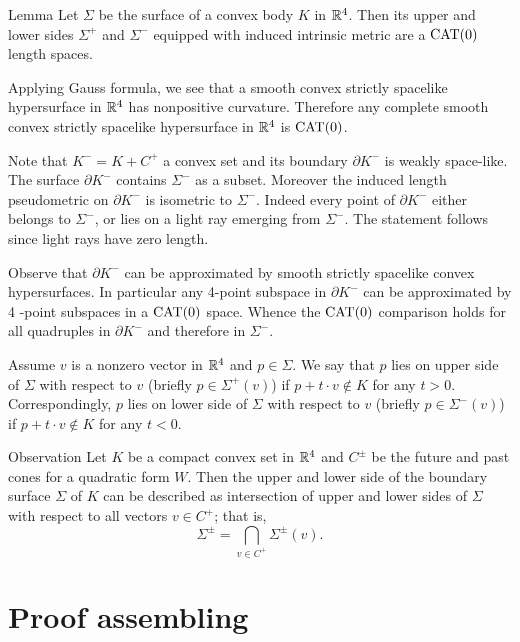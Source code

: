 \documentclass{article}
\begin{document}
\begin{thm}{Lemma}\label{lem:sides}
Let $\Sigma$ be the surface of a convex body $K$ in $\mathbb{R}^4$.
Then its upper and lower sides $\Sigma^+$ and $\Sigma^-$ equipped with induced intrinsic metric are a $\mathrm{CAT}(0)$ length spaces. 
\end{thm}

Applying Gauss formula, we see that a smooth convex strictly spacelike hypersurface in $\mathbb{R}^4$ has nonpositive curvature.
Therefore any complete smooth convex strictly spacelike hypersurface in $\mathbb{R}^4$ is $\mathrm{CAT}(0)$.

Note that $K^-=K+C^+$ a convex set and its boundary $\partial K^-$ is weakly space-like.
The surface $\partial K^-$ contains $\Sigma^-$ as a subset.
Moreover the induced length pseudometric on $\partial K^-$ is isometric to $\Sigma^-$.
Indeed every point of $\partial K^-$ either belongs to  $\Sigma^-$, or lies on a light ray emerging from $\Sigma^-$.
The statement follows since light rays have zero length.

Observe that $\partial K^-$ can be approximated by smooth strictly spacelike convex hypersurfaces.
In particular any 4-point subspace in $\partial K^-$ can be approximated by 4 -point subspaces in a $\mathrm{CAT}(0)$ space.
Whence the $\mathrm{CAT}(0)$ comparison holds for all quadruples in $\partial K^-$ and therefore in $\Sigma^-$.
\qeds




Assume $v$ is a nonzero vector in $\mathbb{R}^4$ and $p\in\Sigma$.
We say that $p$ lies on upper side of $\Sigma$ with respect to $v$ (briefly $p\in \Sigma^+(v)$) if $p+t\cdot v\notin K$ for any $t>0$.
Correspondingly, $p$ lies on lower side of $\Sigma$ with respect to $v$ (briefly $p\in \Sigma^-(v)$) if $p+t\cdot v\notin K$ for any $t<0$.

\begin{thm}{Observation}\label{obs:Sigma(v)}
Let $K$ be a compact convex set in $\mathbb{R}^4$ and $C^\pm$ be the future and past cones for a quadratic form $W$.
Then the upper and lower side of the boundary surface $\Sigma$ of $K$ can be described as intersection of upper and lower sides of $\Sigma$ with respect to all vectors $v\in C^+$;
that is,
\[\Sigma^\pm=\bigcap_{v\in C^+}\Sigma^\pm(v).\]
\end{thm}

\section{Proof assembling}
\end{document}
